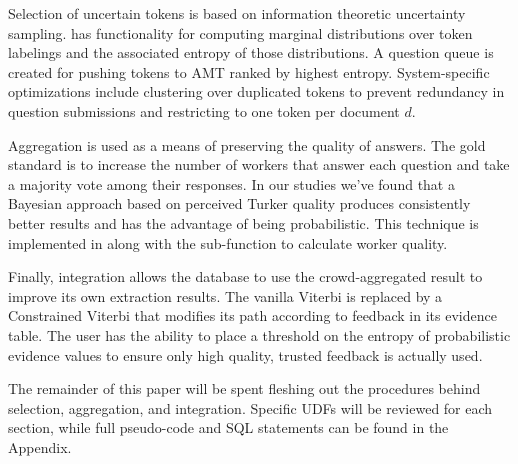 Selection of uncertain tokens is based on information theoretic uncertainty sampling.  \sysName has functionality for computing marginal distributions over token labelings and the associated entropy of those distributions.  A question queue is created for pushing tokens to AMT ranked by highest entropy.  System-specific optimizations include clustering over duplicated tokens to prevent redundancy in question submissions and restricting to one token per document $d$.

Aggregation is used as a means of preserving the quality of answers.  The gold standard is to increase the number of workers that answer each question and take a majority vote among their responses.  In our studies we've found that a Bayesian approach based on perceived Turker quality produces consistently better results and has the advantage of being probabilistic.  This technique is implemented in \sysName along with the sub-function to calculate worker quality.

Finally, integration allows the database to use the crowd-aggregated result to improve its own extraction results.  The vanilla Viterbi is replaced by a Constrained Viterbi that modifies its path according to feedback in its evidence table.  The user has the ability to place a threshold on the entropy of probabilistic evidence values to ensure only high quality, trusted feedback is actually used.     

The remainder of this paper will be spent fleshing out the procedures behind selection, aggregation, and integration.  Specific UDFs will be reviewed for each section, while full pseudo-code and SQL statements can be found in the Appendix.






